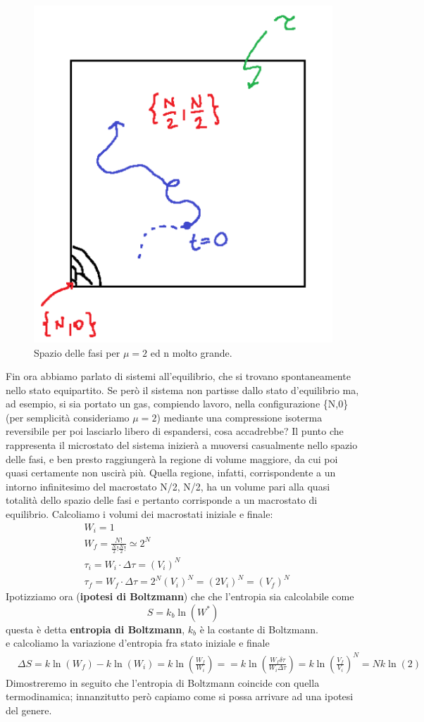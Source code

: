 \documentclass[10pt,a4paper]{article}
\begin{document}
\begin{figure}[h!]
	\centering
	\includegraphics[width=0.4\linewidth]{"../images/Spazio delle fasi"}
	\caption{Spazio delle fasi per $\mu = 2$ ed n molto grande.}
	\label{fig:spazio-delle-fasi}
\end{figure}
\FloatBarrier
Fin ora abbiamo parlato di sistemi all'equilibrio, che si trovano spontaneamente nello stato equipartito. Se però il sistema non partisse dallo stato d'equilibrio ma, ad esempio, si sia portato un gas, compiendo lavoro, nella configurazione \{N,0\} (per semplicità consideriamo $\mu=2$) mediante una compressione isoterma reversibile per poi lasciarlo libero di espandersi, cosa accadrebbe? Il punto che rappresenta il microstato del sistema inizierà a muoversi casualmente nello spazio delle fasi, e ben presto raggiungerà la regione di volume maggiore, da cui poi quasi certamente non uscirà più. Quella regione, infatti, corrispondente a un intorno infinitesimo del macrostato {N/2, N/2}, ha un volume pari alla quasi totalità dello spazio delle fasi e pertanto corrisponde a un macrostato di equilibrio. Calcoliamo i volumi dei macrostati iniziale e finale:
\begin{align*}
	&W_i = 1\\
	&W_f = \frac{N!}{\frac{N}{2}!\frac{N}{2}!}\simeq2^N\\
	&\tau_i = W_i\cdot\Delta\tau = (V_i)^N \\
	&\tau_f = W_f\cdot\Delta\tau = 2^N(V_i)^N=(2 V_i)^N = (V_f)^N
\end{align*}
Ipotizziamo ora (\textbf{ipotesi di Boltzmann}) che che l'entropia sia calcolabile come
\[S=k_b\ln(W^*)\]
questa è detta \textbf{entropia di Boltzmann}, \(k_b\) è la costante di Boltzmann.\\
e calcoliamo la variazione d'entropia fra stato iniziale e finale
\begin{align*}
	&\Delta S = k\ln(W_{f})-k\ln(W_{i})=k\ln\left(\frac{W_f}{W_i}\right)==k\ln\left(\frac{W_f\delta\tau}{W_i\Delta\tau}\right)=k\ln\left(\frac{V_f}{V_i}\right)^N=Nk\ln(2)
\end{align*}
Dimostreremo in seguito che l'entropia di Boltzmann coincide con quella termodinamica; innanzitutto però capiamo come si possa arrivare ad una ipotesi del genere.\\
\end{document}
